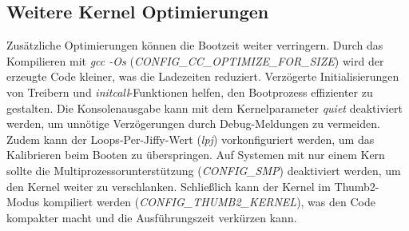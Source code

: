 \subsection{Weitere Kernel Optimierungen}
Zusätzliche Optimierungen können die Bootzeit weiter verringern. Durch das Kompilieren mit \textit{gcc -Os} (\textit{CONFIG\_CC\_OPTIMIZE\_FOR\_SIZE}) wird der erzeugte Code kleiner, was die Ladezeiten reduziert. Verzögerte Initialisierungen von Treibern und \textit{initcall}-Funktionen helfen, den Bootprozess effizienter zu gestalten. Die Konsolenausgabe kann mit dem Kernelparameter \textit{quiet} deaktiviert werden, um unnötige Verzögerungen durch Debug-Meldungen zu vermeiden. Zudem kann der Loops-Per-Jiffy-Wert (\textit{lpj}) vorkonfiguriert werden, um das Kalibrieren beim Booten zu überspringen. Auf Systemen mit nur einem Kern sollte die Multiprozessorunterstützung (\textit{CONFIG\_SMP}) deaktiviert werden, um den Kernel weiter zu verschlanken. Schließlich kann der Kernel im Thumb2-Modus kompiliert werden (\textit{CONFIG\_THUMB2\_KERNEL}), was den Code kompakter macht und die Ausführungszeit verkürzen kann.


